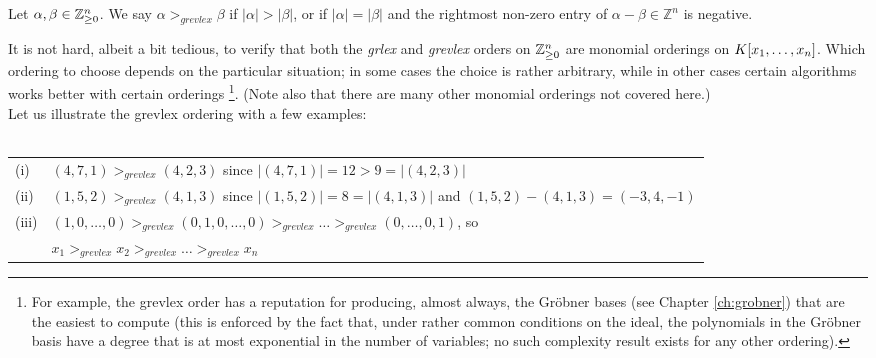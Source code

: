 \documentclass[english,bachelor]{liumaiex}
\begin{document}
\begin{define}
Let $\alpha, \beta \in \mathbb{Z}_{\geq 0}^n$. We say $\alpha >_{grevlex}\beta$ if $\lvert\alpha\rvert > \lvert\beta\rvert$, or if $\lvert\alpha\rvert = \lvert\beta\rvert$ and the rightmost non-zero entry of $\alpha-\beta\in\mathbb{Z}^n$ is negative.
\end{define}
It is not hard, albeit a bit tedious, to verify that both the \emph{grlex} and \emph{grevlex} orders on $\mathbb{Z}_{\geq 0}^n$ are monomial orderings on $K[x_1,\dots, x_n]$. Which ordering to choose depends on the particular situation; in some cases the choice is rather arbitrary, while in other cases certain algorithms works better with certain orderings \footnote{For example, the grevlex order has a reputation for producing, almost always, the Gröbner bases (see Chapter \ref{ch:grobner}) that are the easiest to compute (this is enforced by the fact that, under rather common conditions on the ideal, the polynomials in the Gröbner basis have a degree that is at most exponential in the number of variables; no such complexity result exists for any other ordering).}. (Note also that there are many other monomial orderings not covered here.)\\

Let us illustrate the grevlex ordering with a few examples: \\ \\
\begin{tabular}{l p{10.8cm}}
(i) & $(4,7,1)>_{grevlex}(4,2,3)$ since $\lvert(4,7,1)\rvert=12>9=\lvert(4,2,3)\rvert$\\
(ii) & $(1,5,2)>_{grevlex}(4,1,3)$ since $\lvert(1,5,2)\rvert=8=\lvert(4,1,3)\rvert$ and $(1,5,2)-(4,1,3)=(-3,4,-1)$\\
(iii) & $(1,0,\dots,0)>_{grevlex}(0,1,0,\dots,0)>_{grevlex}\dots>_{grevlex}(0,\dots,0,1)$, so\\
 & $x_1>_{grevlex}x_2>_{grevlex}\dots>_{grevlex}x_n$ \\
\end{tabular}
\end{document}
